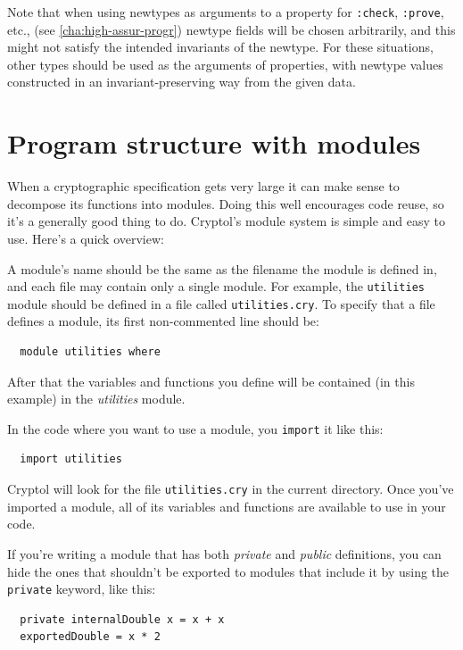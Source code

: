 Note that when using newtypes as arguments to a property for
\texttt{:check}, \texttt{:prove}, etc., (see
\ref{cha:high-assur-progr}) newtype fields will be chosen arbitrarily,
and this might not satisfy the intended invariants of the newtype.
For these situations, other types should be used as the arguments of
properties, with newtype values constructed in an invariant-preserving
way from the given data.

\section{Program structure with modules}

When a cryptographic specification gets very large it can make sense
to decompose its functions into modules.\indModuleSystem\indImport
Doing this well encourages
code reuse, so it's a generally good thing to do. Cryptol's module
system is simple and easy to use. Here's a quick overview:

A module's name should be the same as the filename the module is defined in,
and each file may contain only a single module. For example, the
\verb+utilities+ module should be defined in a file called
\verb+utilities.cry+. To specify that a file defines a module, its first
non-commented line should be:

\begin{verbatim}
  module utilities where
\end{verbatim}

After that the variables and functions you define will be contained
(in this example) in the {\it utilities} module.

In the code where you want to use a module, you \verb+import+ it like this:
\begin{verbatim}
  import utilities
\end{verbatim}

Cryptol will look for the file \verb+utilities.cry+ in the current directory. Once you've imported a module, all of its variables and functions are available to use in your code.

If you're writing a module that has both {\it private} and {\it public}
definitions, you can hide the ones that shouldn't be exported to modules
that include it by using the \verb+private+ keyword, like this:\indPrivate

\begin{verbatim}
  private internalDouble x = x + x
  exportedDouble = x * 2
\end{verbatim}

